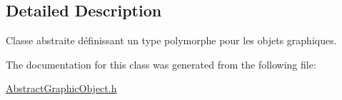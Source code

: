 \subsection{Detailed Description}
Classe abstraite définissant un type polymorphe pour les objets graphiques. 

The documentation for this class was generated from the following file\-:\begin{DoxyCompactItemize}
\item 
\hyperlink{AbstractGraphicObject_8h}{Abstract\-Graphic\-Object.\-h}\end{DoxyCompactItemize}
